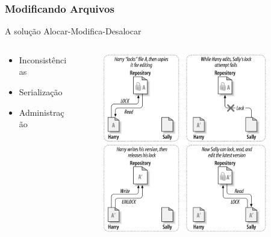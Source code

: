\documentclass{beamer}
\begin{document}
\begin{frame}
    \frametitle{Modificando Arquivos}
    \begin{block}{A solu\c{c}\~ao Alocar-Modifica-Desalocar}
        \begin{columns}
            \begin{column}{.5\textwidth}
                \begin{itemize}
                    \item Inconsist\^encias
                    \item Serializa\c{c}\~ao
                    \item Administra\c{c}\~ao
                \end{itemize}
            \end{column}
            \begin{column}{.5\textwidth}
                \begin{figure}
                    \includegraphics[width=0.9\textwidth]{figures/lockmodifyunlock}
                \end{figure}
            \end{column}
        \end{columns}
    \end{block}
\end{frame}
\end{document}
